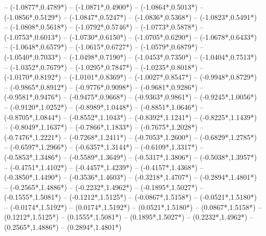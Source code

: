 {	-- ({-1.0877*\dx},{0.4789*\dy})
	-- ({-1.0871*\dx},{0.4900*\dy})
	-- ({-1.0864*\dx},{0.5013*\dy})
	-- ({-1.0856*\dx},{0.5129*\dy})
	-- ({-1.0847*\dx},{0.5247*\dy})
	-- ({-1.0836*\dx},{0.5368*\dy})
	-- ({-1.0823*\dx},{0.5491*\dy})
	-- ({-1.0808*\dx},{0.5618*\dy})
	-- ({-1.0792*\dx},{0.5746*\dy})
	-- ({-1.0773*\dx},{0.5878*\dy})
	-- ({-1.0753*\dx},{0.6013*\dy})
	-- ({-1.0730*\dx},{0.6150*\dy})
	-- ({-1.0705*\dx},{0.6290*\dy})
	-- ({-1.0678*\dx},{0.6433*\dy})
	-- ({-1.0648*\dx},{0.6579*\dy})
	-- ({-1.0615*\dx},{0.6727*\dy})
	-- ({-1.0579*\dx},{0.6879*\dy})
	-- ({-1.0540*\dx},{0.7033*\dy})
	-- ({-1.0498*\dx},{0.7190*\dy})
	-- ({-1.0453*\dx},{0.7350*\dy})
	-- ({-1.0404*\dx},{0.7513*\dy})
	-- ({-1.0352*\dx},{0.7679*\dy})
	-- ({-1.0295*\dx},{0.7847*\dy})
	-- ({-1.0235*\dx},{0.8018*\dy})
	-- ({-1.0170*\dx},{0.8192*\dy})
	-- ({-1.0101*\dx},{0.8369*\dy})
	-- ({-1.0027*\dx},{0.8547*\dy})
	-- ({-0.9948*\dx},{0.8729*\dy})
	-- ({-0.9865*\dx},{0.8912*\dy})
	-- ({-0.9776*\dx},{0.9098*\dy})
	-- ({-0.9681*\dx},{0.9286*\dy})
	-- ({-0.9581*\dx},{0.9476*\dy})
	-- ({-0.9475*\dx},{0.9668*\dy})
	-- ({-0.9363*\dx},{0.9861*\dy})
	-- ({-0.9245*\dx},{1.0056*\dy})
	-- ({-0.9120*\dx},{1.0252*\dy})
	-- ({-0.8989*\dx},{1.0448*\dy})
	-- ({-0.8851*\dx},{1.0646*\dy})
	-- ({-0.8705*\dx},{1.0844*\dy})
	-- ({-0.8552*\dx},{1.1043*\dy})
	-- ({-0.8392*\dx},{1.1241*\dy})
	-- ({-0.8225*\dx},{1.1439*\dy})
	-- ({-0.8049*\dx},{1.1637*\dy})
	-- ({-0.7866*\dx},{1.1833*\dy})
	-- ({-0.7675*\dx},{1.2028*\dy})
	-- ({-0.7476*\dx},{1.2221*\dy})
	-- ({-0.7268*\dx},{1.2411*\dy})
	-- ({-0.7053*\dx},{1.2600*\dy})
	-- ({-0.6829*\dx},{1.2785*\dy})
	-- ({-0.6597*\dx},{1.2966*\dy})
	-- ({-0.6357*\dx},{1.3144*\dy})
	-- ({-0.6109*\dx},{1.3317*\dy})
	-- ({-0.5853*\dx},{1.3486*\dy})
	-- ({-0.5589*\dx},{1.3649*\dy})
	-- ({-0.5317*\dx},{1.3806*\dy})
	-- ({-0.5038*\dx},{1.3957*\dy})
	-- ({-0.4751*\dx},{1.4102*\dy})
	-- ({-0.4457*\dx},{1.4239*\dy})
	-- ({-0.4157*\dx},{1.4368*\dy})
	-- ({-0.3850*\dx},{1.4490*\dy})
	-- ({-0.3536*\dx},{1.4603*\dy})
	-- ({-0.3218*\dx},{1.4707*\dy})
	-- ({-0.2894*\dx},{1.4801*\dy})
	-- ({-0.2565*\dx},{1.4886*\dy})
	-- ({-0.2232*\dx},{1.4962*\dy})
	-- ({-0.1895*\dx},{1.5027*\dy})
	-- ({-0.1555*\dx},{1.5081*\dy})
	-- ({-0.1212*\dx},{1.5125*\dy})
	-- ({-0.0867*\dx},{1.5158*\dy})
	-- ({-0.0521*\dx},{1.5180*\dy})
	-- ({-0.0174*\dx},{1.5192*\dy})
	-- ({0.0174*\dx},{1.5192*\dy})
	-- ({0.0521*\dx},{1.5180*\dy})
	-- ({0.0867*\dx},{1.5158*\dy})
	-- ({0.1212*\dx},{1.5125*\dy})
	-- ({0.1555*\dx},{1.5081*\dy})
	-- ({0.1895*\dx},{1.5027*\dy})
	-- ({0.2232*\dx},{1.4962*\dy})
	-- ({0.2565*\dx},{1.4886*\dy})
	-- ({0.2894*\dx},{1.4801*\dy})
}
